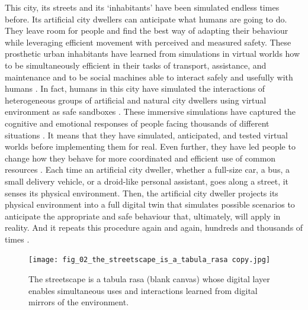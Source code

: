 This city, its streets and its ‘inhabitants’ have been simulated endless times before. Its artificial city dwellers can anticipate what humans are going to do. They leave room for people and find the best way of adapting their behaviour while leveraging efficient movement with perceived and measured safety. These prosthetic urban inhabitants have learned from simulations in virtual worlds how to be simultaneously efficient in their tasks of transport, assistance, and maintenance and to be social machines able to interact safely and usefully with humans \citep{Bauer2009}. In fact, humans in this city have simulated the interactions of heterogeneous groups of artificial and natural city dwellers using virtual environment as safe sandboxes \citep{Fujii2017}. These immersive simulations have captured the cognitive and emotional responses of people facing thousands of different situations \citep{Dubey2016deep, Liu2017urban}. It means that they have simulated, anticipated, and tested virtual worlds before implementing them for real. Even further, they have led people to change how they behave for more coordinated and efficient use of common resources \citep{Theodorou2019}. Each time an artificial city dweller, whether a full-size car, a bus, a small delivery vehicle, or a droid-like personal assistant, goes along a street, it senses its physical environment. Then, the artificial city dweller projects its physical environment into a full digital twin that simulates possible scenarios to anticipate the appropriate and safe behaviour that, ultimately, will apply in reality. And it repeats this procedure again and again, hundreds and thousands of times \citep{blackmirror_hang_the_dj}. 

\setcounter{figure}{-1}
\begin{figure}[htbp!]
    \centering
    \texttt{[image: fig\_02\_the\_streetscape\_is\_a\_tabula\_rasa copy.jpg]}
    \captionsetup{format=plain, justification=centering} %
    \caption{The streetscape is a tabula rasa (blank canvas) whose digital layer enables simultaneous uses and interactions learned from digital mirrors of the environment.}
   \label{fig:street_tabula_rasa}
\end{figure}
\FloatBarrier



